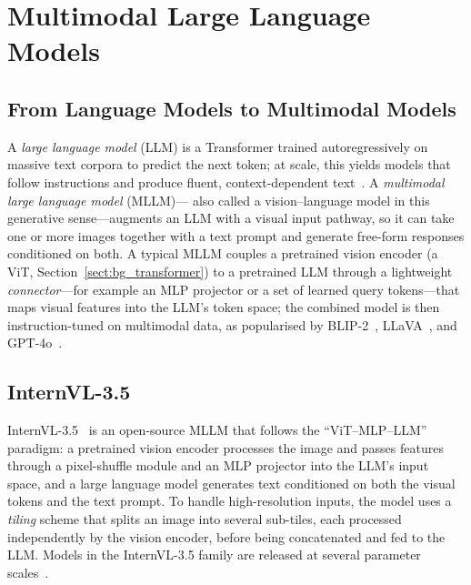 \section{Multimodal Large Language Models}\label{sect:bg_mllm}

\subsection{From Language Models to Multimodal Models}

A \emph{large language model} (LLM) is a Transformer trained autoregressively
on massive text corpora to predict the next token; at scale, this yields models
that follow instructions and produce fluent, context-dependent
text~\cite{brown2020gpt3}. A \emph{multimodal large language model} (MLLM)---
also called a vision--language model in this generative sense---augments an LLM
with a visual input pathway, so it can take one or more images together with a
text prompt and generate free-form responses conditioned on both. A typical MLLM
couples a pretrained vision encoder (a ViT, Section~\ref{sect:bg_transformer})
to a pretrained LLM through a lightweight \emph{connector}---for example an MLP
projector or a set of learned query tokens---that maps visual features into the
LLM's token space; the combined model is then instruction-tuned on multimodal
data, as popularised by BLIP-2~\cite{li2023blip2}, LLaVA~\cite{liu2024llava},
and GPT-4o~\cite{hurst2024gpt4o}.

\subsection{InternVL-3.5}\label{sect:bg_internvl}

InternVL-3.5~\cite{wang2025internvl35} is an open-source MLLM that follows the
``ViT--MLP--LLM'' paradigm: a pretrained vision encoder processes the image and
passes features through a pixel-shuffle module and an MLP projector into the
LLM's input space, and a large language model generates text conditioned on both
the visual tokens and the text prompt. To handle high-resolution inputs, the
model uses a \emph{tiling} scheme that splits an image into several sub-tiles,
each processed independently by the vision encoder, before being concatenated
and fed to the LLM. Models in the InternVL-3.5 family are released at several
parameter scales~\cite{wang2025internvl35}.

